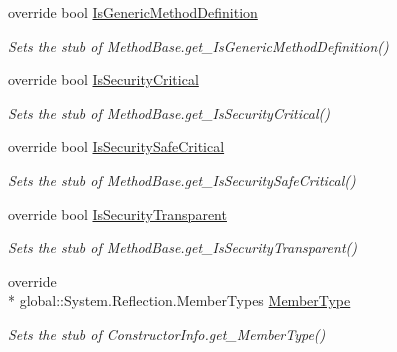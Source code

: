 \begin{DoxyCompactItemize}
override bool \hyperlink{class_system_1_1_reflection_1_1_fakes_1_1_stub_constructor_info_aeea16b4d47b043cc01342e02ae89ef36}{Is\-Generic\-Method\-Definition}
\begin{DoxyCompactList}\small\item\em Sets the stub of Method\-Base.\-get\-\_\-\-Is\-Generic\-Method\-Definition()\end{DoxyCompactList}\item 
override bool \hyperlink{class_system_1_1_reflection_1_1_fakes_1_1_stub_constructor_info_aa16072e9ccbdf4d1337d40f2b4b9170c}{Is\-Security\-Critical}
\begin{DoxyCompactList}\small\item\em Sets the stub of Method\-Base.\-get\-\_\-\-Is\-Security\-Critical()\end{DoxyCompactList}\item 
override bool \hyperlink{class_system_1_1_reflection_1_1_fakes_1_1_stub_constructor_info_a49521c154c5bc2c79944aec45ff2a40b}{Is\-Security\-Safe\-Critical}
\begin{DoxyCompactList}\small\item\em Sets the stub of Method\-Base.\-get\-\_\-\-Is\-Security\-Safe\-Critical()\end{DoxyCompactList}\item 
override bool \hyperlink{class_system_1_1_reflection_1_1_fakes_1_1_stub_constructor_info_a6a4360d9d3344660f1ce99a5bb56613b}{Is\-Security\-Transparent}
\begin{DoxyCompactList}\small\item\em Sets the stub of Method\-Base.\-get\-\_\-\-Is\-Security\-Transparent()\end{DoxyCompactList}\item 
override \\*
global\-::\-System.\-Reflection.\-Member\-Types \hyperlink{class_system_1_1_reflection_1_1_fakes_1_1_stub_constructor_info_a01d64b8c0d839b0e092f8ee06d2c3f7c}{Member\-Type}
\begin{DoxyCompactList}\small\item\em Sets the stub of Constructor\-Info.\-get\-\_\-\-Member\-Type()\end{DoxyCompactList}\item 

\end{DoxyCompactItemize}
